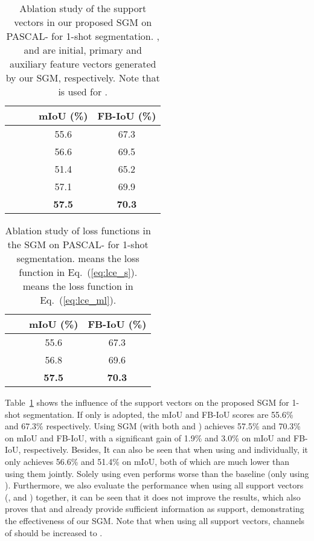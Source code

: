 \documentclass[final]{cvpr}
\begin{document}
\begin{table}[t]
	\centering
	\caption{Ablation study of the support vectors in our proposed SGM on PASCAL- for 1-shot segmentation. ,  and  are initial, primary and auxiliary feature vectors generated by our SGM, respectively. Note that  is used for .} \label{tab:SMM} 
	\begin{tabular}{ccccc}
		\hline
		&  &  & mIoU (\%) &FB-IoU (\%) \\ \hline
		\checkmark &    &     &55.6&67.3\\
		& \checkmark &     &56.6&69.5\\
		&    & \checkmark  &51.4&65.2\\
		\checkmark & \checkmark & \checkmark  &57.1&69.9\\
		&\checkmark & \checkmark  &\textbf{57.5}&\textbf{70.3} \\ \hline
	\end{tabular}
	
\end{table}

\begin{table}[t]
	\centering
	\caption{Ablation study of loss functions in the SGM on PASCAL- for 1-shot segmentation.  means the loss function in Eq.~(\ref{eq:lce_s}).  means the loss function in Eq.~(\ref{eq:lce_ml}).}\label{tab:SMM_loss}
	\begin{tabular}{cccc}
		\hline
		 &  & mIoU (\%) &FB-IoU (\%) \\ \hline
		\checkmark &    & 55.6&67.3\\
		& \checkmark &56.8&69.6\\
		\checkmark & \checkmark &\textbf{57.5}&\textbf{70.3} \\ \hline
	\end{tabular}
\end{table}

Table~\ref{tab:SMM} shows the influence of the support vectors on the proposed SGM for 1-shot segmentation. If only  is adopted, the mIoU and FB-IoU scores are 55.6\% and 67.3\% respectively. Using SGM (with both  and ) achieves 57.5\% and 70.3\% on mIoU and FB-IoU, with a significant gain of 1.9\% and 3.0\% on mIoU and FB-IoU, respectively. Besides, It can also be seen that when using  and  individually, it only achieves 56.6\% and 51.4\% on mIoU, both of which are much lower than using them jointly. Solely using  even performs worse than the baseline (only using ). Furthermore, we also evaluate the performance when using all support vectors (,  and ) together, it can be seen that it does not improve the results, which also proves that  and  already provide sufficient information as support, demonstrating the effectiveness of our SGM. Note that when using all support vectors, channels of  should be increased to . 
\end{document}
